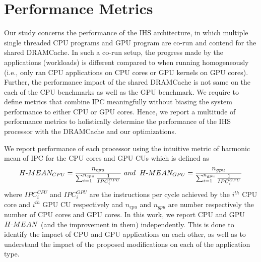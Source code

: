 \section{Performance Metrics} \label{perf-metrics}
Our study concerns the performance of the IHS architecture, in which multiple single threaded CPU programs and GPU program are co-run and contend for the shared DRAMCache. 
In such a co-run setup, the progress made by the applications (workloads) is different compared to when running homogeneously (i.e., only ran CPU applications on CPU cores or GPU kernels on GPU cores). Further, the performance impact of the shared DRAMCache is not same on the each of the CPU benchmarks as well as the GPU benchmark. We require to define metrics that combine IPC meaningfully without biasing the system performance to either CPU or GPU cores. Hence, we report a multitude of performance metrics to holistically determine the performance of the IHS processor with the DRAMCache and our optimizations. 
\par We report performance of each processor using the intuitive metric of harmonic mean of IPC for the CPU cores and GPU CUs which is defined as 
{
\begin{equation*}
H\textnormal{-}MEAN_{CPU} = \frac{n_{cpu}}{\sum_{i=1}^{n_{cpu}} \frac{1}{IPC_{i}^{CPU}}} \ and \hspace{0.2cm} H\textnormal{-}MEAN_{GPU} = \frac{n_{gpu}}{\sum_{i=1}^{n_{gpu}} \frac{1}{IPC_{i}^{GPU}}} 
\end{equation*}
}
where $IPC_i^{CPU}$ and $IPC_i^{GPU}$ are the instructions per cycle achieved by the $i^{th}$ CPU core and $i^{th}$ GPU CU respectively and $n_{cpu}$ and $n_{gpu}$ are number respectively the number of CPU cores and GPU cores.
In this work, we report CPU and GPU $H\textnormal{-}MEAN$ (and the improvement in them) independently. This is done to identify the impact of CPU and GPU applications on each other, as well as to understand the impact of the proposed modifications on each of the application type. 

